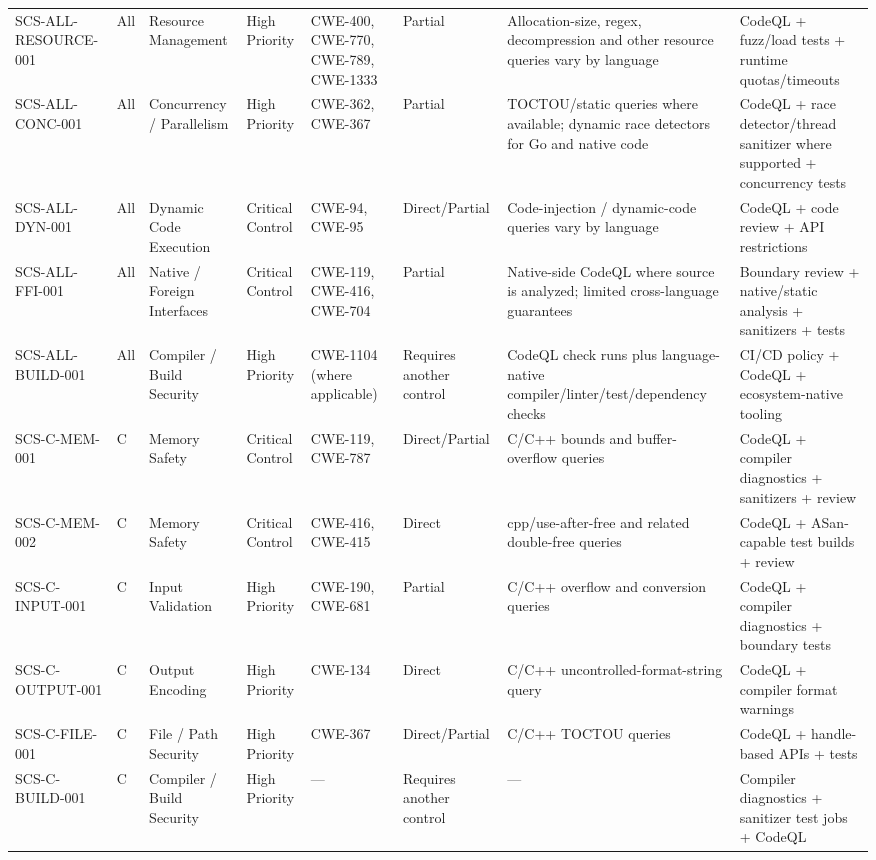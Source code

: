 \documentclass[10pt,letterpaper]{article}
\begin{document}
\begin{landscape}
\begin{longtable}{@{}P{1.0in}P{0.6in}P{0.95in}P{0.75in}P{0.85in}P{0.75in}P{2.0in}P{2.05in}@{}}
SCS-ALL-RESOURCE-001 & All & Resource Management & High Priority & CWE-400, CWE-770, CWE-789, CWE-1333 & Partial & Allocation-size, regex, decompression and other resource queries vary by language & CodeQL + fuzz/load tests + runtime quotas/timeouts\\
SCS-ALL-CONC-001 & All & Concurrency / Parallelism & High Priority & CWE-362, CWE-367 & Partial & TOCTOU/static queries where available; dynamic race detectors for Go and native code & CodeQL + race detector/thread sanitizer where supported + concurrency tests\\
SCS-ALL-DYN-001 & All & Dynamic Code Execution & Critical Control & CWE-94, CWE-95 & Direct/Partial & Code-injection / dynamic-code queries vary by language & CodeQL + code review + API restrictions\\
SCS-ALL-FFI-001 & All & Native / Foreign Interfaces & Critical Control & CWE-119, CWE-416, CWE-704 & Partial & Native-side CodeQL where source is analyzed; limited cross-language guarantees & Boundary review + native/static analysis + sanitizers + tests\\
SCS-ALL-BUILD-001 & All & Compiler / Build Security & High Priority & CWE-1104 (where applicable) & Requires another control & CodeQL check runs plus language-native compiler/linter/test/dependency checks & CI/CD policy + CodeQL + ecosystem-native tooling\\
SCS-C-MEM-001 & C & Memory Safety & Critical Control & CWE-119, CWE-787 & Direct/Partial & C/C++ bounds and buffer-overflow queries & CodeQL + compiler diagnostics + sanitizers + review\\
SCS-C-MEM-002 & C & Memory Safety & Critical Control & CWE-416, CWE-415 & Direct & cpp/use-after-free and related double-free queries & CodeQL + ASan-capable test builds + review\\
SCS-C-INPUT-001 & C & Input Validation & High Priority & CWE-190, CWE-681 & Partial & C/C++ overflow and conversion queries & CodeQL + compiler diagnostics + boundary tests\\
SCS-C-OUTPUT-001 & C & Output Encoding & High Priority & CWE-134 & Direct & C/C++ uncontrolled-format-string query & CodeQL + compiler format warnings\\
SCS-C-FILE-001 & C & File / Path Security & High Priority & CWE-367 & Direct/Partial & C/C++ TOCTOU queries & CodeQL + handle-based APIs + tests\\
SCS-C-BUILD-001 & C & Compiler / Build Security & High Priority & --- & Requires another control & --- & Compiler diagnostics + sanitizer test jobs + CodeQL\\

\end{longtable}
\end{landscape}
\end{document}

